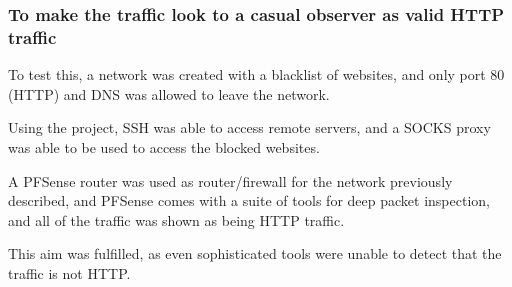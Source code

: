 \subsubsection{To make the traffic look to a casual observer as valid HTTP traffic}
To test this, a network was created with a blacklist of websites, and only port 80 (HTTP) and DNS was allowed to leave the network.\par
Using the project, SSH was able to access remote servers, and a SOCKS proxy was able to be used to access the blocked websites.\par
A PFSense router was used as router/firewall for the network previously described, and PFSense comes with a suite of tools for deep packet inspection, and all of the traffic was shown as being HTTP traffic.\par
This aim was fulfilled, as even sophisticated tools were unable to detect that the traffic is not HTTP\@.
